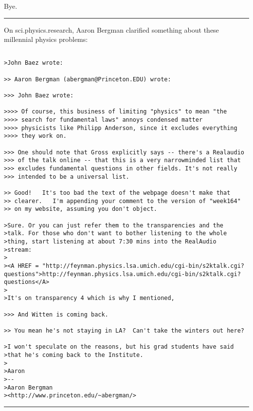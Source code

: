 Bye.

\par\noindent\rule{\textwidth}{0.4pt}
On sci.physics.research, Aaron Bergman clarified something about
these millennial physics problems:


\begin{verbatim}

>John Baez wrote:

>> Aaron Bergman (abergman@Princeton.EDU) wrote:
 
>>> John Baez wrote:

>>>> Of course, this business of limiting "physics" to mean "the 
>>>> search for fundamental laws" annoys condensed matter 
>>>> physicists like Philipp Anderson, since it excludes everything 
>>>> they work on.  
 
>>> One should note that Gross explicitly says -- there's a Realaudio 
>>> of the talk online -- that this is a very narrowminded list that 
>>> excludes fundamental questions in other fields. It's not really 
>>> intended to be a universal list.
 
>> Good!   It's too bad the text of the webpage doesn't make that
>> clearer.   I'm appending your comment to the version of "week164" 
>> on my website, assuming you don't object.

>Sure. Or you can just refer them to the transparencies and the 
>talk. For those who don't want to bother listening to the whole 
>thing, start listening at about 7:30 mins into the RealAudio 
>stream:
>
><A HREF = "http://feynman.physics.lsa.umich.edu/cgi-bin/s2ktalk.cgi?questions">http://feynman.physics.lsa.umich.edu/cgi-bin/s2ktalk.cgi?questions</A>
>
>It's on transparency 4 which is why I mentioned,

>>> And Witten is coming back.
 
>> You mean he's not staying in LA?  Can't take the winters out here?

>I won't speculate on the reasons, but his grad students have said 
>that he's coming back to the Institute. 
>
>Aaron
>-- 
>Aaron Bergman
><http://www.princeton.edu/~abergman/>

\end{verbatim}
    




 \par\noindent\rule{\textwidth}{0.4pt}

